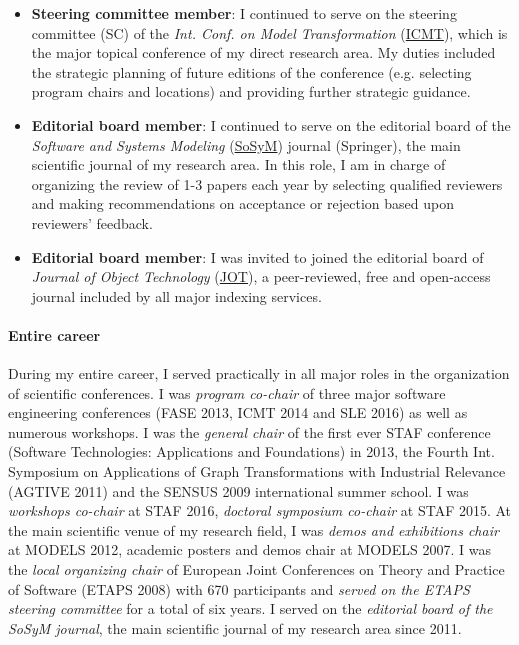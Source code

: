 \begin{itemize}[leftmargin=0.5cm]
\item \textbf{Steering committee member}: I continued to serve on the steering committee (SC) of the \emph{Int. Conf. on Model Transformation} (\href{http://www.model-transformation.org/}{ICMT}), which is the major topical conference of my direct research area. My duties included the strategic planning of future editions of the conference (e.g. selecting program chairs and locations) and providing further strategic guidance.

\item \textbf{Editorial board member}: I continued to serve on the editorial board of the \emph{Software and Systems Modeling} (\href{http://sosym.org/}{SoSyM}) journal (Springer), the main scientific journal of my research area. In this role, I am in charge of organizing the review of 1-3 papers each year by selecting qualified reviewers and making recommendations on acceptance or rejection based upon reviewers' feedback.

\item \textbf{Editorial board member}: I was invited to joined the editorial board of \emph{Journal of Object Technology} (\href{http://www.jot.fm/}{JOT}),  a peer-reviewed, free and open-access journal included by all major indexing services. 
\end{itemize}

\paragraph{Entire career}
During my entire career, I served practically in all major roles in the organization of scientific conferences. %
I was \emph{program co-chair} of three major software engineering conferences (FASE 2013, ICMT 2014 and SLE 2016) as well as numerous workshops. I was the \emph{general chair} of the first ever STAF conference (Software Technologies: Applications and Foundations) in 2013, the Fourth Int. Symposium on Applications of Graph Transformations with Industrial Relevance (AGTIVE 2011) and the SENSUS 2009 international summer school. I was \emph{workshops co-chair} at STAF 2016, \emph{doctoral symposium co-chair} at STAF 2015.
At the main scientific venue of my research field, I was \emph{demos and exhibitions chair} at MODELS 2012, academic posters and demos chair at MODELS 2007.  I was the \emph{local organizing chair} of European Joint Conferences on Theory and Practice of Software (ETAPS 2008) with 670 participants and \emph{served on the ETAPS steering committee} for a total of six years. 
I served on the \emph{editorial board of the SoSyM journal}, the main scientific journal of my research area since 2011.  

